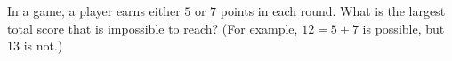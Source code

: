 In a game, a player earns either $5$ or $7$ points in each round. What is the largest total score that is impossible to reach? (For example, $12=5+7$ is possible, but $13$ is not.)
